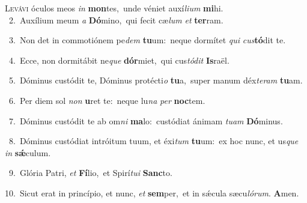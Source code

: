 \lettrine{\initial\textcolor{\initialcolor}{L}}{evávi} óculos meos \textit{in} \textbf{mon}\-tes,~\star unde véniet auxí\-\textit{li}\-\textit{um} \textbf{mi}\-hi.\\
{\numbfont\textcolor{\numbcolor}{~2.}}~Auxílium meum \textit{a} \textbf{Dó}\-mino,~\star qui fecit cæ\textit{lum} \textit{et} \textbf{ter}\-ram.\par
{\numbfont\textcolor{\numbcolor}{~3.}}~Non det in commotiónem pe\textit{dem} \textbf{tu}\-um:~\star neque dormítet \textit{qui} \textit{cus}\-\textbf{tó}dit te.\par
{\numbfont\textcolor{\numbcolor}{~4.}}~Ecce, non dormitábit ne\textit{que} \textbf{dór}\-miet,~\star qui cus\-\textit{tó}\-\textit{dit} \textbf{Is}\-raël.\par
{\numbfont\textcolor{\numbcolor}{~5.}}~Dóminus custódit te, Dóminus protécti\textit{o} \textbf{tu}\-a,~\star super manum déx\-\textit{te}\-\textit{ram} \textbf{tu}\-am.\par
{\numbfont\textcolor{\numbcolor}{~6.}}~Per diem sol \textit{non} \textbf{u}\-ret te:~\star neque lu\textit{na} \textit{per} \textbf{noc}\-tem.\par
{\numbfont\textcolor{\numbcolor}{~7.}}~Dóminus custódit te ab om\textit{ni} \textbf{ma}\-lo:~\star custódiat ánimam \textit{tu}\-\textit{am} \textbf{Dó}\-minus.\par
{\numbfont\textcolor{\numbcolor}{~8.}}~Dóminus custódiat intróitum tuum, et éxi\textit{tum} \textbf{tu}\-um:~\star ex hoc nunc, et us\textit{que} \textit{in} \textbf{sǽ}\-culum.\par
{\numbfont\textcolor{\numbcolor}{~9.}}~Glória Patri, \textit{et} \textbf{Fí}\-lio,~\star et Spirí\-\textit{tu}\-\textit{i} \textbf{Sanc}\-to.\par
{\numbfont\textcolor{\numbcolor}{10.}}~Sicut erat in princípio, et nunc, \textit{et} \textbf{sem}\-per,~\star et in sǽcula sæcu\-\textit{ló}\-\textit{rum}. \textbf{A}\-men.\par
